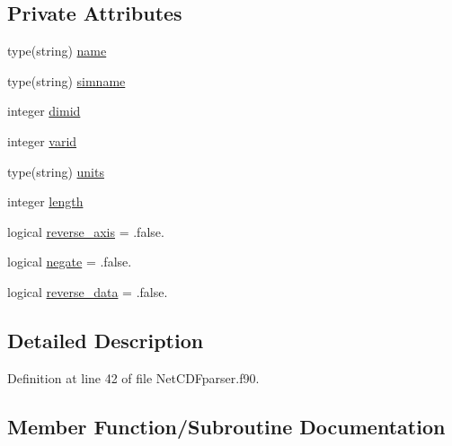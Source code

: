 \subsection*{Private Attributes}
\begin{DoxyCompactItemize}
\item 
type(string) \mbox{\hyperlink{structnetcdfparser__mod_1_1dim__t_ac9200bc4639dedfbd0fe2345ec44d448}{name}}
\item 
type(string) \mbox{\hyperlink{structnetcdfparser__mod_1_1dim__t_a14ab4a777ae4e2429332ddc08f875601}{simname}}
\item 
integer \mbox{\hyperlink{structnetcdfparser__mod_1_1dim__t_ae0eee1b309e61daefc73868795c35cc9}{dimid}}
\item 
integer \mbox{\hyperlink{structnetcdfparser__mod_1_1dim__t_a850c5b53b1fa2c09e19ee37896065897}{varid}}
\item 
type(string) \mbox{\hyperlink{structnetcdfparser__mod_1_1dim__t_a42d4e5dd93905b5b6912dd7675d0e1db}{units}}
\item 
integer \mbox{\hyperlink{structnetcdfparser__mod_1_1dim__t_ad099f35ecc70f2370e69eddfa21235dd}{length}}
\item 
logical \mbox{\hyperlink{structnetcdfparser__mod_1_1dim__t_ae52ef90e32f69fb816c34eef2c25a9c5}{reverse\+\_\+axis}} = .false.
\item 
logical \mbox{\hyperlink{structnetcdfparser__mod_1_1dim__t_a3c5c37fcdaf204d8c51fe4fb0dc21e83}{negate}} = .false.
\item 
logical \mbox{\hyperlink{structnetcdfparser__mod_1_1dim__t_acf99009f46de2c7f946506d74977c2c5}{reverse\+\_\+data}} = .false.
\end{DoxyCompactItemize}


\subsection{Detailed Description}


Definition at line 42 of file Net\+C\+D\+Fparser.\+f90.



\subsection{Member Function/\+Subroutine Documentation}
\mbox{\label{structnetcdfparser__mod_1_1dim__t_aeb8d02051698385d0c46029a9a39c30f}} 

